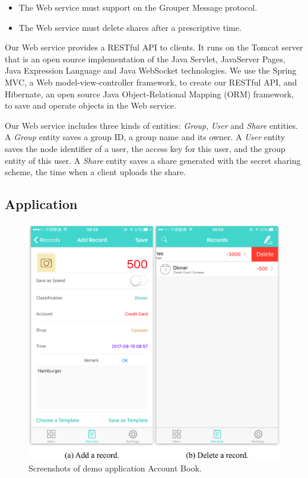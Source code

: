 \documentclass[twocolumn,10pt]{article}
\begin{document}
\begin{itemize}
	\setlength{\itemsep}{1pt}
	\setlength{\parskip}{0pt}
	\setlength{\parsep}{0pt}
	\item The Web service must support on the Grouper Message protocol.
	\item The Web service must delete shares after a prescriptive time.
\end{itemize}

Our Web service provides a RESTful API to clients.
It runs on the Tomcat server\cite{tomcat} that is an open source implementation of the Java Servlet, JavaServer Pages, Java Expression Language and Java WebSocket technologies. 
We use the Spring MVC\cite{spring}, a  Web model-view-controller framework, to create our RESTful API, and Hibernate\cite{hibernate}, an open source Java Object-Relational Mapping (ORM) framework, to save and operate objects in the Web service. 

Our Web service includes three kinds of entities: \emph{Group}, \emph{User} and \emph{Share} entities. 
A \emph{Group} entity saves a group ID, a group name and its owner. 
A \emph{User} entity saves the node identifier of a user, the access key for this user, and the group entity of this user. 
A \emph{Share} entity saves a share generated with the secret sharing scheme, the time when a client uploads the share. 

\subsection{Application}

\begin{figure}[t]
	\centering
	\includegraphics[scale=0.5]{account_book}
	\caption{Screenshots of demo application Account Book.}
\end{figure}
\end{document}
